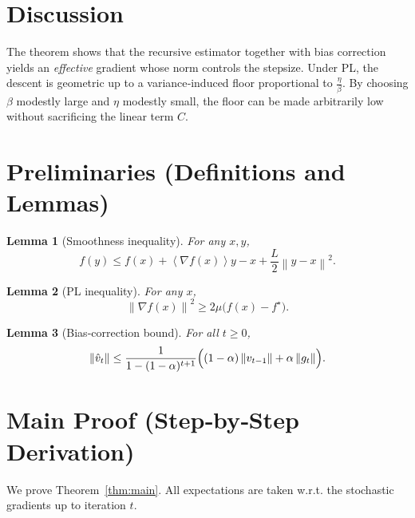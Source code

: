 \documentclass{article}
\newtheorem{lemma}{Lemma}
\newcommand{\norm}[1]{\left\lVert #1 \right\rVert}
\newcommand{\inner}[1]{\left\langle #1 \right\rangle}
\begin{document}
\section*{Discussion}
The theorem shows that the recursive estimator together with bias correction yields an \emph{effective} gradient whose norm controls the stepsize. Under PL, the descent is geometric up to a variance‑induced floor proportional to $\frac{\eta}{\beta}$. By choosing $\beta$ modestly large and $\eta$ modestly small, the floor can be made arbitrarily low without sacrificing the linear term $C$.

\newpage
\section*{Preliminaries (Definitions and Lemmas)}
\begin{lemma}[Smoothness inequality]\label{lem:smooth}
For any $x,y$,
\[
    f(y)\le f(x)+\inner{\nabla f(x)}{y-x}+\frac{L}{2}\norm{y-x}^2 .
\]
\end{lemma}
\begin{lemma}[PL inequality]\label{lem:pl}
For any $x$,
\[
    \norm{\nabla f(x)}^2\ge 2\mu\bigl(f(x)-f^\star\bigr).
\]
\end{lemma}
\begin{lemma}[Bias‑correction bound]\label{lem:bias}
For all $t\ge0$,
\[
    \norm{\hat v_t}\le\frac{1}{1-(1-\alpha)^{t+1}}\Bigl((1-\alpha)\norm{v_{t-1}}+\alpha\norm{g_t}\Bigr).
\]
\end{lemma}

\section*{Main Proof (Step‑by‑Step Derivation)}
We prove Theorem~\ref{thm:main}.  
All expectations are taken w.r.t. the stochastic gradients up to iteration $t$.
\end{document}
